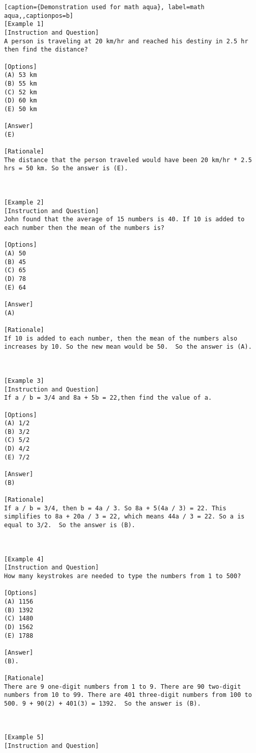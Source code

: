 \onecolumn
{}


\begin{lstlisting}[caption={Demonstration used for math aqua}, label=math aqua,,captionpos=b]
[Example 1]
[Instruction and Question] 
A person is traveling at 20 km/hr and reached his destiny in 2.5 hr then find the distance?

[Options]
(A) 53 km
(B) 55 km
(C) 52 km
(D) 60 km
(E) 50 km

[Answer] 
(E)

[Rationale]
The distance that the person traveled would have been 20 km/hr * 2.5 hrs = 50 km. So the answer is (E). 



[Example 2]
[Instruction and Question] 
John found that the average of 15 numbers is 40. If 10 is added to each number then the mean of the numbers is?

[Options]
(A) 50
(B) 45
(C) 65
(D) 78
(E) 64

[Answer] 
(A)

[Rationale]
If 10 is added to each number, then the mean of the numbers also increases by 10. So the new mean would be 50.  So the answer is (A).



[Example 3]
[Instruction and Question] 
If a / b = 3/4 and 8a + 5b = 22,then find the value of a.

[Options]
(A) 1/2
(B) 3/2
(C) 5/2
(D) 4/2
(E) 7/2

[Answer] 
(B)

[Rationale]
If a / b = 3/4, then b = 4a / 3. So 8a + 5(4a / 3) = 22. This simplifies to 8a + 20a / 3 = 22, which means 44a / 3 = 22. So a is equal to 3/2.  So the answer is (B).



[Example 4]
[Instruction and Question] 
How many keystrokes are needed to type the numbers from 1 to 500?

[Options]
(A) 1156
(B) 1392
(C) 1480
(D) 1562
(E) 1788

[Answer] 
(B).

[Rationale]
There are 9 one-digit numbers from 1 to 9. There are 90 two-digit numbers from 10 to 99. There are 401 three-digit numbers from 100 to 500. 9 + 90(2) + 401(3) = 1392.  So the answer is (B).



[Example 5]
[Instruction and Question]

    \end{lstlisting}
    




